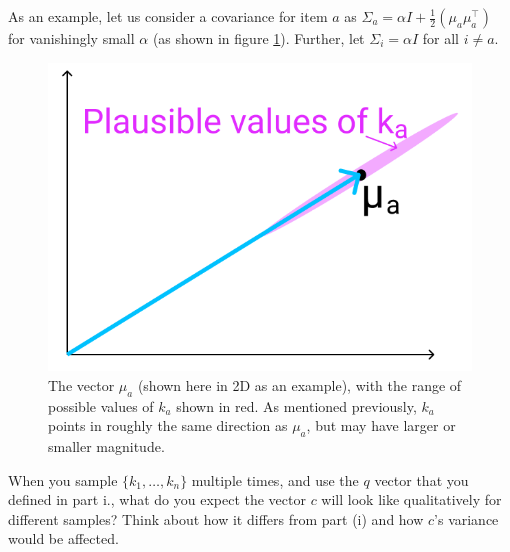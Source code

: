 \begin{enumerate}[(a)]
\begin{enumerate}[label=\roman*.]
    As an example, let us consider a covariance for item $a$ as $\Sigma_a = \alpha I + \frac{1}{2}(\mu_a\mu_a^\top)$ for vanishingly small $\alpha$ (as shown in figure \ref{ka_plausible}).
    Further, let $\Sigma_i = \alpha I$ for all $i \neq a$. %


    \begin{figure}[h]
        \centering
        \captionsetup{justification=centering,margin=2cm}
        \includegraphics[width=0.35\linewidth]{images/ka_plausible.png}
        \caption{The vector $\mu_a$ (shown here in 2D as an example), with the range of possible values of $k_a$ shown in red. As mentioned previously, $k_a$ points in roughly the same direction as $\mu_a$, but may have larger or smaller magnitude.}
        \label{ka_plausible}
    \end{figure}

    When you sample $\{k_1,\dots,k_n\}$ multiple times, and use the $q$ vector that you defined in part i., what do you expect the vector $c$ will look like qualitatively for different samples? Think about how it differs from part (i) and how $c$'s variance would be affected.

    \end{enumerate}



\end{enumerate}

